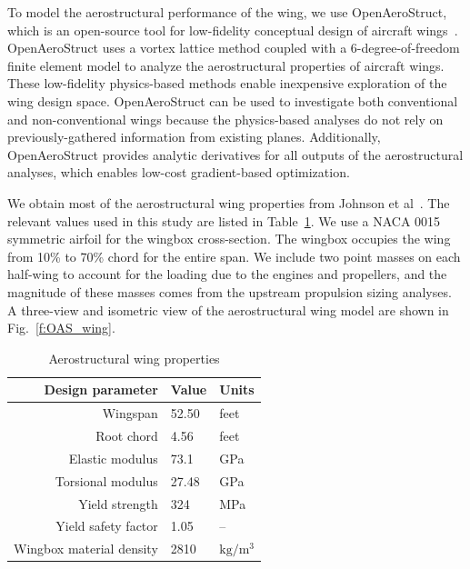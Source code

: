 
To model the aerostructural performance of the wing, we use OpenAeroStruct, which is an open-source tool for low-fidelity conceptual design of aircraft wings~\cite{Jasa2018a}.
OpenAeroStruct uses a vortex lattice method coupled with a 6-degree-of-freedom finite element model to analyze the aerostructural properties of aircraft wings.
These low-fidelity physics-based methods enable inexpensive exploration of the wing design space.
OpenAeroStruct can be used to investigate both conventional and non-conventional wings because the physics-based analyses do not rely on previously-gathered information from existing planes.
Additionally, OpenAeroStruct provides analytic derivatives for all outputs of the aerostructural analyses, which enables low-cost gradient-based optimization.

We obtain most of the aerostructural wing properties from Johnson et al~\cite{johnson2018concept}.
The relevant values used in this study are listed in Table~\ref{t:aerostruct_wing}.
We use a NACA 0015 symmetric airfoil for the wingbox cross-section.
The wingbox occupies the wing from 10\% to 70\% chord for the entire span.
We include two point masses on each half-wing to account for the loading due to the engines and propellers, and the magnitude of these masses comes from the upstream propulsion sizing analyses.
A three-view and isometric view of the aerostructural wing model are shown in Fig.~\ref{f:OAS_wing}.

\begin{table}[!htb]
 \normalsize
 \begin{center}
  \caption{Aerostructural wing properties}
  \label{t:aerostruct_wing}
    \begin{tabular}{ r l l }
        \hline
        \textbf{Design parameter} & \textbf{Value} & \textbf{Units} \\
        \hline
        Wingspan & 52.50 & feet \\
        Root chord & 4.56 & feet \\
        Elastic modulus & 73.1 & GPa \\
        Torsional modulus & 27.48 & GPa \\
        Yield strength & 324 & MPa \\
        Yield safety factor & 1.05 & -- \\
        Wingbox material density & 2810 & $\text{kg}/\text{m}^3$ \\
        \hline
    \end{tabular}
 \end{center}
\end{table}

